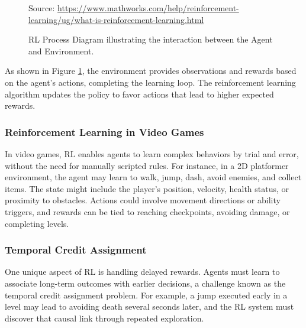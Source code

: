\documentclass[12pt,oneside,openright,a4paper]{cpe-english-project}
\begin{document}
\begin{figure}[H]
\centering
{}
\caption{RL Process Diagram illustrating the interaction between the Agent and Environment.}\label{fig:ReinforceModelDia}
Source:
\href{https://www.mathworks.com/help/reinforcement-learning/ug/what-is-reinforcement-learning.html} {https://www.mathworks.com/help/reinforcement-learning/ug/what-is-reinforcement-learning.html}
\end{figure}

As shown in Figure \ref{fig:ReinforceModelDia}, the environment provides observations and rewards based on the agent’s actions, completing the learning loop. The reinforcement learning algorithm updates the policy to favor actions that lead to higher expected rewards.

\subsubsection{Reinforcement Learning in Video Games}

In video games, RL enables agents to learn complex behaviors by trial and error, without the need for manually scripted rules. For instance, in a 2D platformer environment, the agent may learn to walk, jump, dash, avoid enemies, and collect items. The state might include the player’s position, velocity, health status, or proximity to obstacles. Actions could involve movement directions or ability triggers, and rewards can be tied to reaching checkpoints, avoiding damage, or completing levels.

\subsubsection{Temporal Credit Assignment}

One unique aspect of RL is handling delayed rewards. Agents must learn to associate long-term outcomes with earlier decisions, a challenge known as the temporal credit assignment problem. For example, a jump executed early in a level may lead to avoiding death several seconds later, and the RL system must discover that causal link through repeated exploration.
\end{document}
